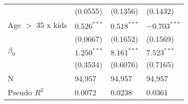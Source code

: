 \begin{tabular}{llll}
                       &           (0.0555) &           (0.1356) &           (0.1432) \\
Age $>$ 35 x kids      &      $0.526^{***}$ &      $0.518^{***}$ &     $-0.703^{***}$ \\
                       &           (0.0667) &           (0.1652) &           (0.1569) \\
$\beta_0$              &      $1.250^{***}$ &      $8.161^{***}$ &      $7.523^{***}$ \\
                       &           (0.3534) &           (0.6076) &           (0.7165) \\
N                      &             94,957 &             94,957 &             94,957 \\
Pseudo $R^2$           &             0.0072 &             0.0238 &             0.0361 \\
\bottomrule
\end{tabular}
